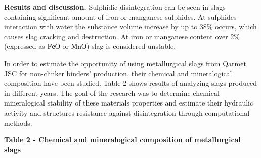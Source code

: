 \textbf{Results and discussion.} Sulphidic disintegration can be seen in
slags containing significant amount of iron or manganese sulphides. At
sulphides\textquotesingle{} interaction with water the substance volume
increase by up to 38\% occurs, which causes slag cracking and
destruction. At iron or manganese content over 2\% (expressed as FеО or
МnО) slag is considered unstable.

In order to estimate the opportunity of using metallurgical slags from
Qarmet JSC for non-clinker binders' production, their chemical and
mineralogical composition have been studied. Table 2 shows results of
analyzing slags produced in different years. The goal of the research
was to determine chemical-mineralogical stability of these
materials\textquotesingle{} properties and estimate their hydraulic
activity and structure\textquotesingle s resistance against
disintegration through computational methods.

\textbf{Table 2 - Chemical and mineralogical composition of
metallurgical slags}


